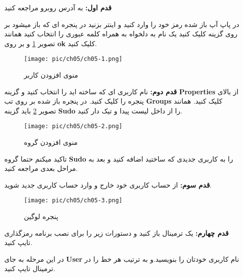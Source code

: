 \begin{enumerate}
	\item[\textbf{قدم اول:}] به آدرس  روبرو مراجعه کنید

	
	در پاپ آپ باز شده رمز خود را وارد کنید و اینتر بزنید در پنجره ای که باز میشود بر روی گزینه  
	\textbf{}
	کلیک کنید یک نام به دلخواه به همراه کلمه عبوری را انتخاب کنید همانند تصویر 
	\ref{pic-37}
	و بر روی 
	\textbf{ok}
	کلیک کنید.
	\begin{figure}[H]%
		\caption{منوی افزودن کاربر}
		\begin{center}
			\texttt{[image: pic/ch05/ch05-1.png]}
		\end{center}
		\label{pic-37}
	\end{figure}
\item[\textbf{قدم دوم:}] 
نام کاربری ای که ساخته اید را انتخاب کنید و گزینه 
\textbf{Properties} 
از بالای پنجره را کلیک کنید. در پنجره باز شده بر روی تب 
\textbf{Groups}
کلیک کنید.
همانند تصویر
\ref{pic-38}
 باید گزینه 
\textbf{Sudo}
را از داخل لیست پیدا و تیک دار کنید.
\begin{figure}[H]%
	\caption{منوی افزودن گروه}
	\begin{center}
		\texttt{[image: pic/ch05/ch05-2.png]}
	\end{center}
	\label{pic-38}
\end{figure}
\begin{tcolorbox}[title=افزون گروه]
	تاکید میکنم حتما گروه 
	\textbf{Sudo}
	را به کاربری جدیدی که ساختید اضافه کنید و بعد به مراحل بعدی مراجعه کنید.
\end{tcolorbox}
\item[\textbf{قدم سوم:}] 
از حساب کاربری خود خارج و وارد حساب کاربری جدید شوید.
\begin{figure}[H]%
	\caption{پنجره لوگین}
	\begin{center}
		\texttt{[image: pic/ch05/ch05-3.png]}
	\end{center}
	\label{pic-39}
\end{figure}
	\item[\textbf{قدم چهارم:}] 
	یک ترمینال باز کنید و دستورات زیر را برای نصب برنامه رمزگذاری تایپ کنید.
		\begin{flushleft}
	\end{flushleft}
	در این مرحله به جای
	\textbf{User}
	نام کاربری خودتان را بنویسید.و به ترتیب هر خط را در ترمینال تایپ کنید.
	\begin{flushleft}
		\xmybox[cyan]{\lr{su -c "usermod -a -G ecryptfs user"}}
		

\end{flushleft}
\end{enumerate}
